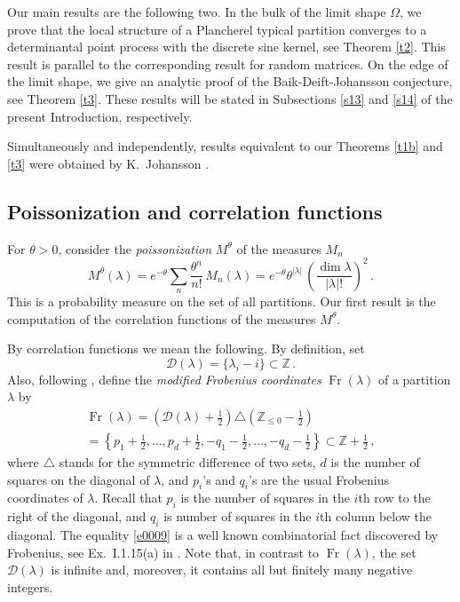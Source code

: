 \documentclass[12pt]{amsart}
\newcommand{\la}{\lambda}
\newcommand{\sD}{\mathcal{D}}
\newcommand{\Z}{\mathbb{Z}}
\newcommand{\Fr}{\operatorname{Fr}}
\newcommand{\sh}{{\textstyle \frac12}}
\newcommand{\ix}{\theta}
\theoremstyle{plain}
\theoremstyle{definition}
\numberwithin{equation}{section}
\begin{document}
Our main results are the following two. In the bulk of the limit
shape $\Omega$, we prove that the local
structure of a Plancherel typical partition converges to  
a determinantal  point process with the discrete sine kernel,
see Theorem \ref{t2}. This result is parallel to the corresponding result for
random matrices.  On the edge of the limit shape, we give
an analytic proof of  the Baik-Deift-Johansson conjecture,
see Theorem \ref{t3}. These results will be stated in
Subsections \ref{s13} and \ref{s14} of the present
Introduction, respectively. 

Simultaneously and independently, results equivalent to our
Theorems \ref{t1b} and \ref{t3} were obtained by K.~Johansson
\cite{J2}. 

\subsection{Poissonization and correlation functions}\label{s12}


For $\ix>0$, consider 
the {\it poissonization} $M^\ix$ of the measures $M_n$
%
\begin{equation*}
M^\ix (\la) = e^{-\ix}\sum_n \frac{\ix^n}{n!}\, M_n(\la) =
e^{-\ix} \ix^{|\la|} \,
\left(\frac{\dim\la}{|\la|!}
\right)^2 \,. 
\end{equation*}
%
This is a probability measure on the set of all partitions. 
Our first result is the computation of the correlation
functions of the measures $M^\ix$. 

By correlation functions we mean the following. 
By definition, set
$$
\sD(\la)=\{\la_i-i\}\subset\Z \,.
$$
Also, following \cite{VK3}, define  the {\em modified 
Frobenius coordinates} $\Fr(\la)$ of a partition $\la$ by 
%
\begin{multline}\label{e0009}
\Fr(\la)=\left(\sD(\la)+\sh\right)\triangle \left(\Z_{\le 0} -\sh\right)\\
=
\left\{p_1+\sh,\dots,p_d+\sh,-q_1-\sh,\dots,-q_d-\sh
\right\} \subset \Z+\sh\,,
\end{multline}
%
where $\triangle$ stands for the symmetric difference of two sets,
$d$ is the number of squares on the diagonal of $\la$, 
and $p_i$'s and $q_i$'s are the usual Frobenius
coordinates of $\la$. Recall that $p_i$ is the number of
squares in the $i$th row  to the right  of the diagonal,
and $q_i$ is number of squares in the $i$th column
below the diagonal. The equality \eqref{e0009} is a well known
combinatorial fact discovered by
Frobenius, see Ex.~I.1.15(a) in \cite{M}.
Note that, in contrast to $\Fr(\la)$, the
set $\sD(\la)$ is infinite and, moreover, it contains all but
finitely many negative integers. 
\end{document}
